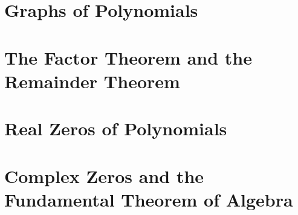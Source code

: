 \section{Graphs of Polynomials}



\newpage

\section{The Factor Theorem and the Remainder Theorem}



\newpage

\section{Real Zeros of Polynomials}



\newpage

\section{Complex Zeros and the Fundamental Theorem of Algebra}



\newpage